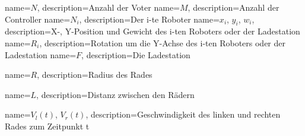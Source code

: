 {
       name={\ensuremath{N}},
       description={Anzahl der Voter}
}
{
       name={\ensuremath{M}},
       description={Anzahl der Controller}
}
{
       name={\ensuremath{N_i}},
       description={Der i-te Roboter}
}
{
       name={\ensuremath{x_i}, \ensuremath{y_i}, \ensuremath{w_i}},
       description={X-, Y-Position und Gewicht des i-ten Roboters oder der Ladestation}
}
{
       name={\ensuremath{R_i}},
       description={Rotation um die Y-Achse des i-ten Roboters oder der Ladestation}
}
{
       name={\ensuremath{F}},
       description={Die Ladestation}
}

{
       name={\ensuremath{R}},
       description={Radius des Rades}
}

{
       name={\ensuremath{L}},
       description={Distanz zwischen den R{\"{a}}dern}
}

{
       name={\ensuremath{V_l(t)}, \ensuremath{V_r(t)}},
       description={Geschwindigkeit des linken und rechten Rades zum Zeitpunkt t}
}
